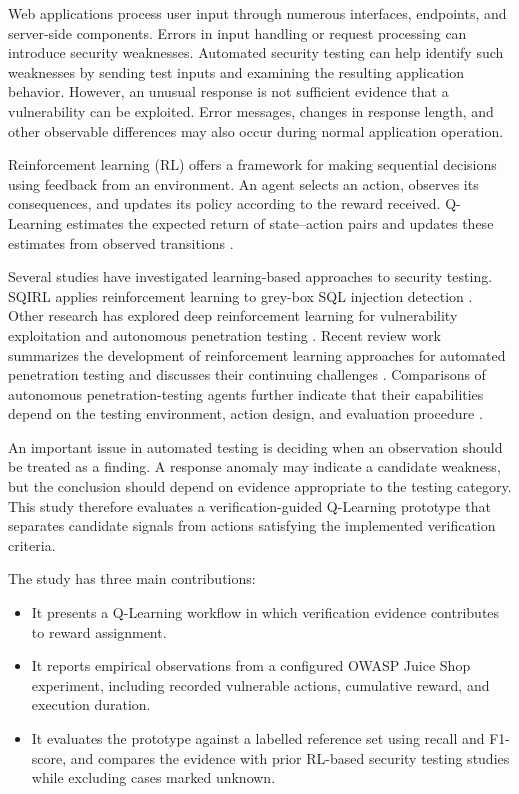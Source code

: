 \documentclass[conference]{IEEEtran}
\begin{document}
Web applications process user input through numerous
interfaces, endpoints, and server-side components. Errors
in input handling or request processing can introduce
security weaknesses. Automated security testing can help
identify such weaknesses by sending test inputs and
examining the resulting application behavior. However,
an unusual response is not sufficient evidence that a
vulnerability can be exploited. Error messages, changes
in response length, and other observable differences may
also occur during normal application operation.

Reinforcement learning (RL) offers a framework for making
sequential decisions using feedback from an environment.
An agent selects an action, observes its consequences, and
updates its policy according to the reward received.
Q-Learning estimates the expected return of state--action
pairs and updates these estimates from observed transitions
\cite{sutton2018}.

Several studies have investigated learning-based approaches
to security testing. SQIRL applies reinforcement learning
to grey-box SQL injection detection \cite{sqirl2023}.
Other research has explored deep reinforcement learning
for vulnerability exploitation and autonomous penetration
testing \cite{almajali2024,li2025}. Recent review work
summarizes the development of reinforcement learning
approaches for automated penetration testing and discusses
their continuing challenges \cite{rlreview2026}. Comparisons
of autonomous penetration-testing agents further indicate
that their capabilities depend on the testing environment,
action design, and evaluation procedure \cite{sok2024}.

An important issue in automated testing is deciding when
an observation should be treated as a finding. A response
anomaly may indicate a candidate weakness, but the
conclusion should depend on evidence appropriate to the
testing category. This study therefore evaluates a
verification-guided Q-Learning prototype that separates
candidate signals from actions satisfying the implemented
verification criteria.

The study has three main contributions:

\begin{itemize}
    \item It presents a Q-Learning workflow in which
    verification evidence contributes to reward assignment.

    \item It reports empirical observations from a configured
    OWASP Juice Shop experiment, including recorded vulnerable
    actions, cumulative reward, and execution duration.

    \item It evaluates the prototype against a labelled
    reference set using recall and F1-score, and compares the
    evidence with prior RL-based security testing studies while
    excluding cases marked unknown.
\end{itemize}
\end{document}
